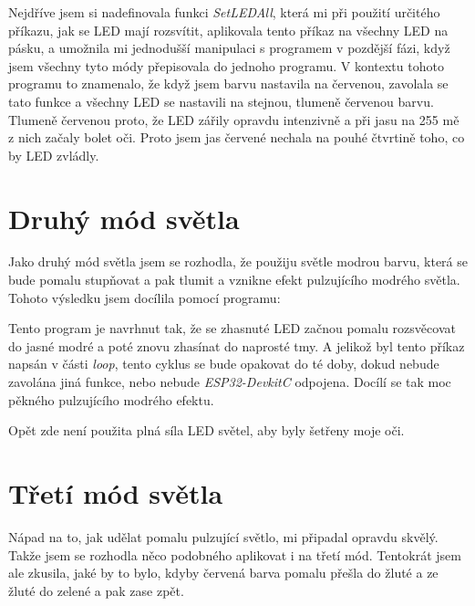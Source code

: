 Nejdříve jsem si nadefinovala funkci \emph{SetLEDAll}, která mi při použití určitého příkazu, jak se LED mají rozsvítit, aplikovala tento příkaz na všechny LED na pásku, a umožnila mi jednodušší manipulaci s programem v pozdější fázi, když jsem všechny tyto módy přepisovala do jednoho programu. 
V kontextu tohoto programu to znamenalo, že když jsem barvu nastavila na červenou, zavolala se tato funkce a všechny LED se nastavili na stejnou, tlumeně červenou barvu. Tlumeně červenou proto, že LED zářily opravdu intenzivně a při jasu na 255 mě z nich začaly bolet oči. Proto jsem jas červené nechala na pouhé čtvrtině toho, co by LED zvládly.



\section{Druhý mód světla}
Jako druhý mód světla jsem se rozhodla, že použiju světle modrou barvu, která se bude pomalu stupňovat a pak tlumit a vznikne efekt pulzujícího modrého světla. Tohoto výsledku jsem docílila pomocí programu: 


%


Tento program je navrhnut tak, že se zhasnuté LED začnou pomalu rozsvěcovat do jasné modré a poté znovu zhasínat do naprosté tmy. A jelikož byl tento příkaz napsán v části \emph{loop}, tento cyklus se bude opakovat do té doby, dokud nebude zavolána jiná funkce, nebo nebude \emph{ESP32-DevkitC} odpojena. Docílí se tak moc pěkného pulzujícího modrého efektu. 

Opět zde není použita plná síla LED světel, aby byly šetřeny moje oči.  


\section{Třetí mód světla}
Nápad na to, jak udělat pomalu pulzující světlo, mi připadal opravdu skvělý. Takže jsem se rozhodla něco podobného aplikovat i na třetí mód. Tentokrát jsem ale zkusila, jaké by to bylo, kdyby červená barva pomalu přešla do žluté a ze žluté do zelené a pak zase zpět.


